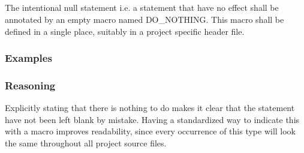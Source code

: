 \subsection*{\codingRule{}}

The intentional null statement i.e. a statement that have no effect shall be annotated by an empty macro named DO\_NOTHING. This macro shall be defined in a single place, suitably in a project specific header file.

\subsubsection*{Examples}

\noindent
\begin{minipage}[t]{\codelstwidth\linewidth}
    
\end{minipage}
\hfill
\begin{minipage}[t]{\codelstwidth\linewidth}
    
\end{minipage}

\subsubsection*{Reasoning}

Explicitly stating that there is nothing to do makes it clear that the statement have not been left blank by mistake. Having a standardized way to indicate this with a macro improves readability, since every occurrence of this type will look the same throughout all project source files.